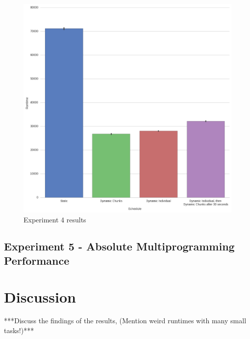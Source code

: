 \begin{figure}
	\centering
	\includegraphics[width=\textwidth]{graphics/experiment4.png}
	\caption{Experiment 4 results}
	\label{fig:results_ex4}
\end{figure}





\subsection{Experiment 5 - Absolute Multiprogramming Performance}





\section{Discussion}

 ***Discuss the findings of the results, (Mention weird runtimes with many small tasks!)***